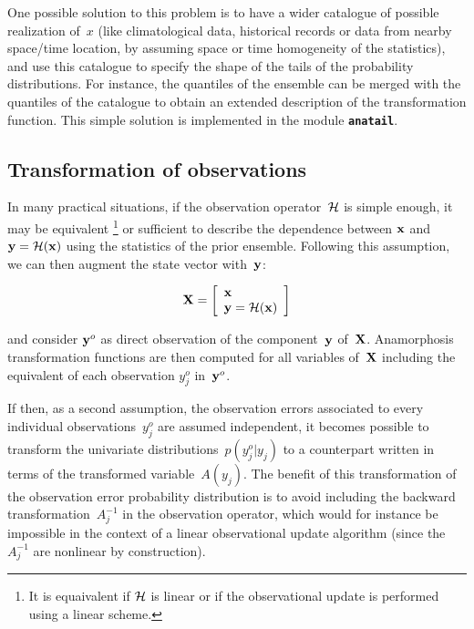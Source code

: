 \documentclass[11pt]{article}
\begin{document}
One possible solution to this problem is to have a wider catalogue
of possible realization of~$x$
(like climatological data, historical records or data from nearby space/time location,
by assuming space or time homogeneity of the statistics),
and use this catalogue to specify the shape of the tails of the probability distributions.
For instance, the quantiles of the ensemble can be merged with the quantiles of the catalogue
to obtain an extended description of the transformation function.
This simple solution is implemented in the module {\tt\bf anatail}.

\subsection{Transformation of observations}
\label{method:obs}

In many practical situations, if the observation operator~${\cal H}$ is simple enough,
it may be equivalent%
\footnote{It is equaivalent if ${\cal H}$ is linear or if the observational
update is performed using a linear scheme.}
or sufficient to describe the dependence between ${\bf x}$ and~${\bf y} = {\cal H}({\bf x})$
using the statistics of the prior ensemble.
Following this assumption, we can then augment the state vector with~${\bf y}$:

$${\bf X} = \left[ \begin{array}{l} {\bf x} \\ {\bf y} = {\cal H}({\bf x}) \end{array} \right]$$

\noindent
and consider ${\bf y}^o$ as direct observation of the component~${\bf y}$ of~${\bf X}$.
Anamorphosis transformation functions are then computed for all variables of~${\bf X}$
including the equivalent of each observation $y^o_j$ in~${\bf y}^o$.

If then, as a second assumption, the observation errors associated to every individual
observations~$y^o_j$ are assumed independent,
it becomes possible to transform the univariate distributions~$p(y^o_j|y_j)$
to a counterpart written in terms of the transformed variable~$A(y_j)$.
The benefit of this transformation of the observation error probability distribution
is to avoid including the backward transformation~$A_j^{-1}$ in the observation operator,
which would for instance be impossible in the context of a linear observational update algorithm
(since the $A_j^{-1}$ are nonlinear by construction).
\end{document}
